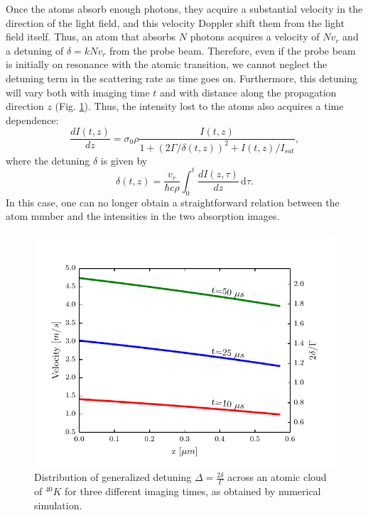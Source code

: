 \documentclass[12pt]{iopart}
\begin{document}
\par Once the atoms absorb enough photons, they acquire a substantial velocity in the direction of the light field, and this velocity Doppler shift them from the light field itself. Thus, an atom that absorbs $N$ photons acquires a velocity of $N v_r$ and a detuning of $\delta=k N v_r$ from the probe beam. Therefore, even if the probe beam is initially on resonance with the atomic transition, we cannot neglect the detuning term in the scattering rate as time goes on. Furthermore, this detuning will vary both with imaging time $t$ and with distance along the propagation direction $z$ (Fig. \ref{fig:detunedBlobs}). Thus, the intensity lost to the atoms also acquires a time dependence: 
\begin{equation}
\frac{dI(t,z)}{dz}=\sigma_0 \rho \frac{I(t,z)}{1+(2\Gamma/\delta(t,z))^2 +I(t,z)/I_{sat}}, \label{eq3}
\end{equation}
where the detuning $\delta$ is given by 
\begin{equation}
\delta(t,z)=\frac{v_r}{\hbar c \rho}\int_0^t \frac{dI(z,\tau)}{dz}\,\mathrm{d}\tau. \label{eq4} 
\end{equation}
In this case, one can no longer obtain a straightforward relation between the atom number and the intensities in the two absorption images.
\begin{figure}
	\includegraphics*{Figure1.pdf}
\caption{Distribution of generalized detuning $\Delta=\frac{2\delta}{\Gamma}$ across an atomic cloud of $^{40}K$ for three different imaging times, as obtained by numerical simulation.}  
\label{fig:detunedBlobs}
\end{figure}
\end{document}
